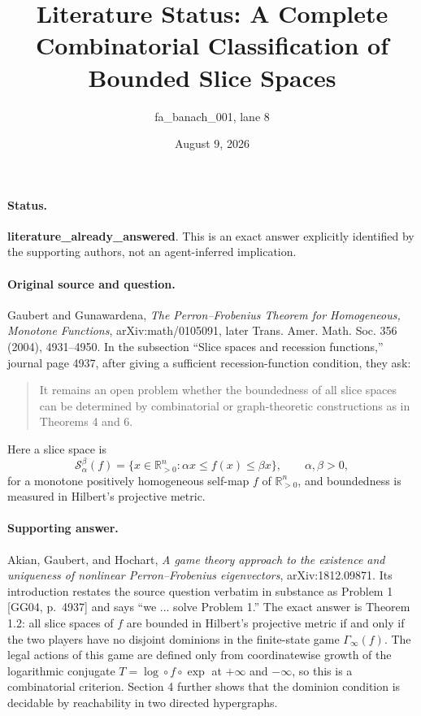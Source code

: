 \documentclass[10pt]{article}
\title{Literature Status: A Complete Combinatorial Classification of Bounded Slice Spaces}
\author{fa\_banach\_001, lane 8}
\date{August 9, 2026}
\begin{document}
\maketitle

\paragraph{Status.}
\textbf{literature\_already\_answered}.  This is an exact answer explicitly identified by the supporting authors, not an agent-inferred implication.

\paragraph{Original source and question.}
Gaubert and Gunawardena, \emph{The Perron--Frobenius Theorem for Homogeneous, Monotone Functions}, arXiv:math/0105091, later Trans. Amer. Math. Soc. 356 (2004), 4931--4950.  In the subsection ``Slice spaces and recession functions,'' journal page 4937, after giving a sufficient recession-function condition, they ask:
\begin{quote}
It remains an open problem whether the boundedness of all slice spaces can be determined by combinatorial or graph-theoretic constructions as in Theorems 4 and 6.
\end{quote}
Here a slice space is
\[
  \mathcal S^\beta_\alpha(f)
  =\{x\in\mathbb R^n_{>0}:\alpha x\leq f(x)\leq \beta x\},
  \qquad \alpha,\beta>0,
\]
for a monotone positively homogeneous self-map $f$ of $\mathbb R^n_{>0}$, and boundedness is measured in Hilbert's projective metric.

\paragraph{Supporting answer.}
Akian, Gaubert, and Hochart, \emph{A game theory approach to the existence and uniqueness of nonlinear Perron--Frobenius eigenvectors}, arXiv:1812.09871.  Its introduction restates the source question verbatim in substance as Problem 1 [GG04, p.~4937] and says ``we ... solve Problem 1.''  The exact answer is Theorem 1.2: all slice spaces of $f$ are bounded in Hilbert's projective metric if and only if the two players have no disjoint dominions in the finite-state game $\Gamma_\infty(f)$.  The legal actions of this game are defined only from coordinatewise growth of the logarithmic conjugate $T=\log\circ f\circ\exp$ at $+\infty$ and $-\infty$, so this is a combinatorial criterion.  Section 4 further shows that the dominion condition is decidable by reachability in two directed hypergraphs.
\end{document}
